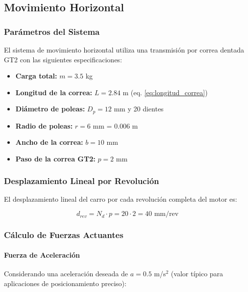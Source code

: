 \subsection{Movimiento Horizontal}

\subsubsection{Parámetros del Sistema}

El sistema de movimiento horizontal utiliza una transmisión por correa dentada GT2 con las siguientes especificaciones:

\begin{itemize}
    \item \textbf{Carga total:} $m = 3.5$ kg
    \item \textbf{Longitud de la correa:} $L = 2.84$ m (eq. \ref{eq:longitud_correa})
    \item \textbf{Diámetro de poleas:} $D_p = 12$ mm y 20 dientes
    \item \textbf{Radio de poleas:} $r = 6$ mm = $0.006$ m
    \item \textbf{Ancho de la correa:} $b = 10$ mm
    \item \textbf{Paso de la correa GT2:} $p = 2$ mm
\end{itemize}

\subsubsection{Desplazamiento Lineal por Revolución}

El desplazamiento lineal del carro por cada revolución completa del motor es:

\begin{equation}
    d_{rev} = N_d \cdot p = 20 \cdot 2 = 40 \text{ mm/rev}
\end{equation}

\subsubsection{Cálculo de Fuerzas Actuantes}

\paragraph{Fuerza de Aceleración}

Considerando una aceleración deseada de $a = 0.5$ m/s$^2$ (valor típico para aplicaciones de posicionamiento preciso):

